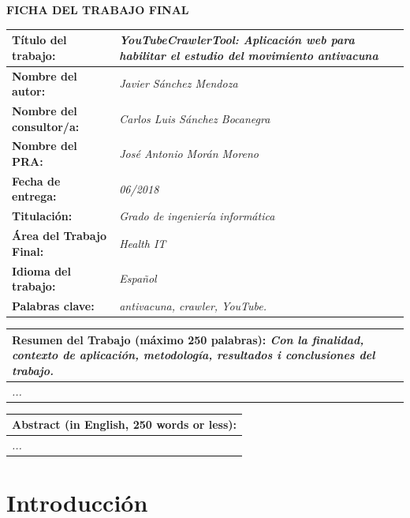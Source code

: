 \documentclass[11pt,a4paper]{article}
\begin{document}
\begin{center}
\textbf{FICHA DEL TRABAJO FINAL}
\end{center}
\begin{tabularx}{\textwidth}{|X|X|}
\hline 
\textbf{Título del trabajo:} &\cellcolor{gray!25} \textit{YouTubeCrawlerTool: Aplicación web para habilitar el estudio del movimiento antivacuna} \\ 
\hline 
\textbf{Nombre del autor:} &\cellcolor{gray!25} \textit{Javier Sánchez Mendoza} \\ 
\hline 
\textbf{Nombre del consultor/a:} &\cellcolor{gray!25} \textit{Carlos Luis Sánchez Bocanegra} \\ 
\hline 
\textbf{Nombre del PRA:} &\cellcolor{gray!25} \textit{José Antonio Morán Moreno} \\ 
\hline 
\textbf{Fecha de entrega:} &\cellcolor{gray!25} \textit{06/2018} \\ 
\hline 
\textbf{Titulación:} &\cellcolor{gray!25} \textit{Grado de ingeniería informática} \\ 
\hline 
\textbf{Área del Trabajo Final:} &\cellcolor{gray!25} \textit{Health IT} \\ 
\hline 
\textbf{Idioma del trabajo:} &\cellcolor{gray!25} \textit{Español} \\ 
\hline 
\textbf{Palabras clave:} &\cellcolor{gray!25} \textit{antivacuna, crawler, YouTube.} \\ 
\hline
\end{tabularx} 
\begin{tabularx}{\textwidth}{|X|}
\textbf{Resumen del Trabajo (máximo 250 palabras):} \textit{Con la finalidad, contexto de aplicación, metodología, resultados i conclusiones del trabajo.} \\ 
\hline 
\cellcolor{gray!25} \textit{...} \\
\hline 
\end{tabularx} 
\newpage 


\begin{tabularx}{\textwidth}{|X|}
\hline 
\textbf{Abstract (in English, 250 words or less):} \\ 
\hline 
\cellcolor{gray!25} \textit{...} \\
\hline 
\end{tabularx} 
\newpage 


\tableofcontents
\newpage


\listoffigures
\newpage


\section{Introducción}
\bigskip 
\end{document}
